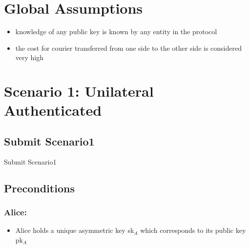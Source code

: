 \documentclass{article}
\begin{document}
\setlength{\marginparwidth}{20pt}

\section*{Global Assumptions}
\begin{itemize}
\item knowledge of any public key is known by any entity in the protocol
\item the cost for courier transferred from one side to the other side is considered very high
\end{itemize}
\vspace{20pt}

\section*{Scenario 1: Unilateral Authenticated}
\subsection*{Submit Scenario1}
\begin{msc}{Submit Scenario1}
\setlength{\instdist}{3\instdist}
\setlength{\envinstdist}{2\envinstdist}
\setlength{\levelheight}{1.5\levelheight}

\nextlevel[2]
\nextlevel
{}
\nextlevel
{}
\nextlevel
{}
\nextlevel[2]
\nextlevel
{}
\nextlevel[2]
\nextlevel
\end{msc}


\subsection*{Preconditions}
\subsubsection*{Alice:}
\begin{itemize}
\item Alice holds a unique asymmetric key sk$_A$ which corresponds to its public key pk$_A$
\end{itemize}
\end{document}
